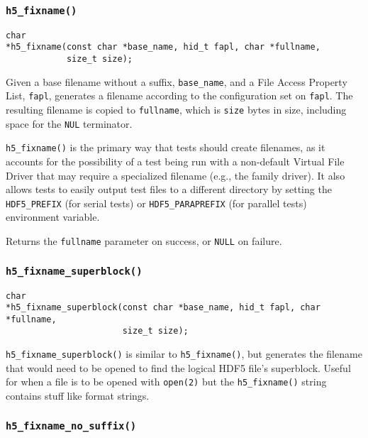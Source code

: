 \documentclass[../HDF5_RFC.tex]{subfiles}
\begin{document}
\subsubsection{\texttt{h5\_fixname()}}
\label{apdx:h5test_h5fixname}

\begin{verbatim}
char
*h5_fixname(const char *base_name, hid_t fapl, char *fullname,
            size_t size);
\end{verbatim}

Given a base filename without a suffix, \texttt{base\_name}, and a File Access Property List, \texttt{fapl},
generates a filename according to the configuration set on \texttt{fapl}. The resulting filename is copied
to \texttt{fullname}, which is \texttt{size} bytes in size, including space for the \texttt{NUL} terminator.

\texttt{h5\_fixname()} is the primary way that tests should create filenames, as it accounts for the
possibility of a test being run with a non-default Virtual File Driver that may require a specialized
filename (e.g., the family driver). It also allows tests to easily output test files to a different
directory by setting the \texttt{HDF5\_PREFIX} (for serial tests) or \texttt{HDF5\_PARAPREFIX} (for parallel
tests) environment variable.

Returns the \texttt{fullname} parameter on success, or \texttt{NULL} on failure.

\subsubsection{\texttt{h5\_fixname\_superblock()}}

\begin{verbatim}
char
*h5_fixname_superblock(const char *base_name, hid_t fapl, char *fullname,
                       size_t size);
\end{verbatim}

\texttt{h5\_fixname\_superblock()} is similar to \texttt{h5\_fixname()}, but generates the filename that
would need to be opened to find the logical HDF5 file's superblock. Useful for when a file is to be opened
with \texttt{open(2)} but the \texttt{h5\_fixname()} string contains stuff like format strings.

\subsubsection{\texttt{h5\_fixname\_no\_suffix()}}
\end{document}
